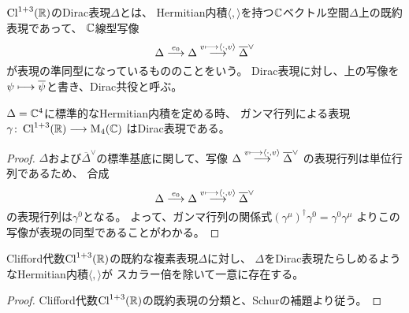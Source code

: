 \begin{dfn}
  $\operatorname{Cl}^{1+3}(\mathbb{R})$のDirac表現$\Delta$とは、
  Hermitian内積$\langle,\rangle$を持つ$\mathbb{C}$ベクトル空間$\Delta$上の既約表現であって、
  $\mathbb{C}$線型写像
  \begin{equation}
    \Delta \stackrel{e_0}{\longrightarrow} \Delta
    \stackrel{v \longmapsto \langle \cdot, v \rangle}{\longrightarrow}
    \overline{\Delta}^\vee
  \end{equation}
  が表現の準同型になっているもののことをいう。
  Dirac表現に対し、上の写像を$\psi\longmapsto\overline{\psi}$と書き、Dirac共役と呼ぶ。
\end{dfn}

\begin{thm}
  $\Delta=\mathbb{C}^4$に標準的なHermitian内積を定める時、
  ガンマ行列による表現
  $\gamma\colon\operatorname{Cl}^{1+3}(\mathbb{R})\longrightarrow \operatorname{M}_4(\mathbb{C})$
  はDirac表現である。
\end{thm}

\begin{proof}
  $\Delta$および$\overline{\Delta}^\vee$の標準基底に関して、写像
  $\Delta\stackrel{v \longmapsto \langle \cdot, v\rangle}{\longrightarrow}\overline{\Delta}^\vee$
  の表現行列は単位行列であるため、
  合成
  \begin{equation}
    \Delta \stackrel{e_0}{\longrightarrow} \Delta
    \stackrel{v \longmapsto \langle \cdot, v \rangle}{\longrightarrow}
    \overline{\Delta}^\vee
  \end{equation}
  の表現行列は$\gamma^0$となる。
  よって、ガンマ行列の関係式$(\gamma^\mu)^\dagger\gamma^0=\gamma^0\gamma^\mu$
  よりこの写像が表現の同型であることがわかる。
\end{proof}

\begin{thm}
  Clifford代数$\operatorname{Cl}^{1+3}(\mathbb{R})$の既約な複素表現$\Delta$に対し、
  $\Delta$をDirac表現たらしめるようなHermitian内積$\langle,\rangle$が
  スカラー倍を除いて一意に存在する。
\end{thm}

\begin{proof}
  Clifford代数$\operatorname{Cl}^{1+3}(\mathbb{R})$の既約表現の分類と、Schurの補題より従う。
\end{proof}
